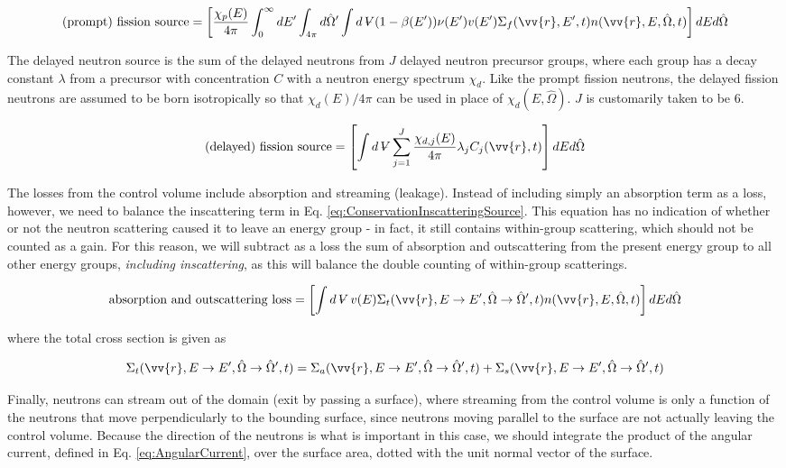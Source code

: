 \documentclass[10pt]{article}
\newcommand{\beq}{\begin{equation}}
\newcommand{\eeq}{\end{equation}}
\newcommand{\hO}{\hat{\Omega}}
\newcommand{\spa}{(\vv{r}, E, \hO, t)}
\newcommand{\spangr}{(\vv{r},E\rightarrow E', \hO\rightarrow\hO',t)}
\newcommand{\volume}{\mathop{\ooalign{\hfil$V$\hfil\cr\kern0.08em--\hfil\cr}}\nolimits}
\begin{document}
\begin{flushleft}
\beq
\label{eq:ConservationFissionPrompt}
\textrm{(prompt) fission source} = \left\lbrack\frac{\chi_p(E)}{4\pi} \int_{0}^{\infty} dE'\int_{4\pi}^{} d\hO  '\int d\volume (1-\beta(E'))\nu(E')v(E')\Sigma_f(\vv{r},E',t)n\spa \right\rbrack dEd\hO  
\eeq

The delayed neutron source is the sum of the delayed neutrons from \(J\) delayed neutron precursor groups, where each group has a decay constant \(\lambda\) from a precursor with concentration \(C\) with a neutron energy spectrum \(\chi_d\). Like the prompt fission neutrons, the delayed fission neutrons are assumed to be born isotropically so that \(\chi_d(E)/4\pi\) can be used in place of \(\chi_d(E,\hO)\). \(J\) is customarily taken to be 6.

\beq
\label{eq:ConservationFissionDelayed}
\textrm{(delayed) fission source} = \left\lbrack\int d\volume \sum_{j=1}^{J} \frac{\chi_{d,j}(E)}{4\pi} \lambda_j C_j(\vv{r}, t)\right\rbrack dEd\hO  
\eeq

The losses from the control volume include absorption and streaming (leakage). Instead of including simply an absorption term as a loss, however, we need to balance the inscattering term in Eq. \ref{eq:ConservationInscatteringSource}. This equation has no indication of whether or not the neutron scattering caused it to leave an energy group - in fact, it still contains within-group scattering, which should not be counted as a gain. For this reason, we will subtract as a loss the sum of absorption and outscattering from the present energy group to all other energy groups, \textit{including inscattering}, as this will balance the double counting of within-group scatterings. 

\beq
\label{eq:ConservationTotal}
\textrm{absorption and outscattering loss}=\left\lbrack\int d\volume v(E)\Sigma_t(\vv{r},E\rightarrow E',\hO\rightarrow\hO',t) n\spa \right\rbrack dEd\hO  
\eeq

where the total cross section is given as

\beq
\Sigma_t\spangr=\Sigma_a\spangr+\Sigma_s(\vv{r},E\rightarrow E',\hO\rightarrow\hO',t)
\eeq

Finally, neutrons can stream out of the domain (exit by passing a surface), where streaming from the control volume is only a function of the neutrons that move perpendicularly to the bounding surface, since neutrons moving parallel to the surface are not actually leaving the control volume. Because the direction of the neutrons is what is important in this case, we should integrate the product of the angular current, defined in Eq. \eqref{eq:AngularCurrent}, over the surface area, dotted with the unit normal vector of the surface. 


\end{flushleft}
\end{document}
